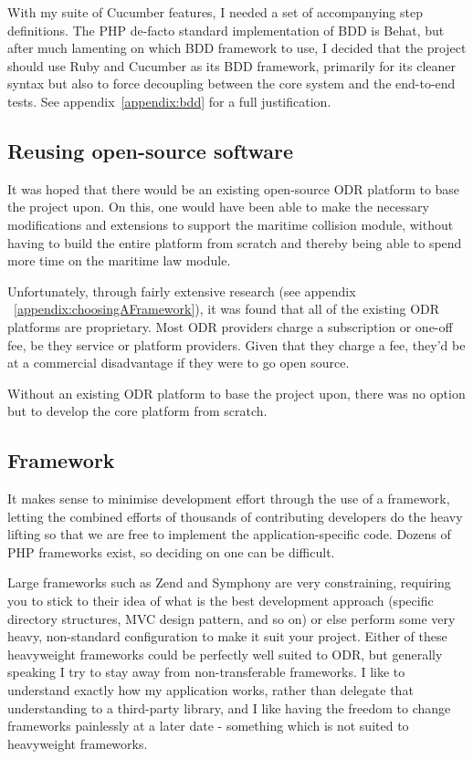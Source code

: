 With my suite of Cucumber features, I needed a set of accompanying step definitions. The PHP de-facto standard implementation of BDD is Behat,  but after much lamenting on which BDD framework to use, I decided that the project should use Ruby and Cucumber as its BDD framework, primarily for its cleaner syntax but also to force decoupling between the core system and the end-to-end tests. See appendix~\ref{appendix:bdd} for a full justification.

\subsection{Reusing open-source software}

It was hoped that there would be an existing open-source ODR platform to base the project upon. On this, one would have been able to make the necessary modifications and extensions to support the maritime collision module, without having to build the entire platform from scratch and thereby being able to spend more time on the maritime law module.

Unfortunately, through fairly extensive research (see appendix ~\ref{appendix:choosingAFramework}), it was found that all of the existing ODR platforms are proprietary. Most ODR providers charge a subscription or one-off fee, be they service or platform providers. Given that they charge a fee, they'd be at a commercial disadvantage if they were to go open source.

Without an existing ODR platform to base the project upon, there was no option but to develop the core platform from scratch.

\subsection{Framework}

It makes sense to minimise development effort through the use of a framework, letting the combined efforts of thousands of contributing developers do the heavy lifting so that we are free to implement the application-specific code. Dozens of PHP frameworks exist, so deciding on one can be difficult.

Large frameworks such as Zend and Symphony are very constraining, requiring you to stick to their idea of what is the best development approach (specific directory structures, MVC design pattern, and so on) or else perform some very heavy, non-standard configuration to make it suit your project. Either of these heavyweight frameworks could be perfectly well suited to ODR, but generally speaking I try to stay away from non-transferable frameworks. I like to understand exactly how my application works, rather than delegate that understanding to a third-party library, and I like having the freedom to change frameworks painlessly at a later date - something which is not suited to heavyweight frameworks.

